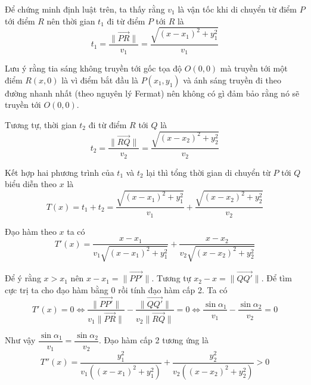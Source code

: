 Để chứng minh định luật trên, ta thấy rằng $v_1$ là vận tốc khi di chuyển từ điểm $P$ tới điểm $R$ nên thời gian $t_1$ đi từ điểm $P$ tới $R$ là
\begin{equation}
    t_1 = \frac{\lVert \overrightarrow{PR} \rVert}{v_1} = \frac{\sqrt{(x - x_1)^2 + y_1^2}}{v_1}
\end{equation}

Lưu ý rằng tia sáng không truyền tới gốc tọa độ $O(0,0)$ mà truyền tới một điểm $R(x,0)$ là vì điểm bắt đầu là $P(x_1, y_1)$ và ánh sáng truyền đi theo đường nhanh nhất (theo nguyên lý Fermat) nên không có gì đảm bảo rằng nó sẽ truyền tới $O(0, 0)$.

Tương tự, thời gian $t_2$ đi từ điểm $R$ tới $Q$ là
\begin{equation}
    t_2 = \frac{\lVert \overrightarrow{RQ} \rVert}{v_2} = \frac{\sqrt{(x - x_2)^2 + y_2^2}}{v_2}
\end{equation}

Kết hợp hai phương trình của $t_1$ và $t_2$ lại thì tổng thời gian di chuyển từ $P$ tới $Q$ biểu diễn theo $x$ là
\begin{equation}
    T(x) = t_1 + t_2 = \frac{\sqrt{(x - x_1)^2 + y_1^2}}{v_1} + \frac{\sqrt{(x - x_2)^2 + y_2^2}}{v_2}
\end{equation}

Đạo hàm theo $x$ ta có
\begin{equation}
    T'(x) = \frac{x - x_1}{v_1 \sqrt{(x - x_1)^2 + y_1^2}} + \frac{x - x_2}{v_2 \sqrt{(x - x_2)^2 + y_2^2}}
\end{equation}

Để ý rằng $x > x_1$ nên $x - x_1 = \lVert \overrightarrow{PP'} \rVert$. Tương tự $x_2 - x = \lVert \overrightarrow{QQ'} \rVert$. Để tìm cực trị ta cho đạo hàm bằng 0 rồi tính đạo hàm cấp 2. Ta có
\begin{equation*}
    T'(x) = 0 \Leftrightarrow \frac{\lVert \overrightarrow{PP'} \rVert}{v_1 \lVert \overrightarrow{PR} \rVert} - \frac{\lVert \overrightarrow{QQ'} \rVert}{v_2 \lVert \overrightarrow{RQ} \rVert} = 0 \Leftrightarrow \frac{\sin \alpha_1}{v_1} - \frac{\sin \alpha_2}{v_2} = 0
\end{equation*}

Như vậy $\dfrac{\sin \alpha_1}{v_1} = \dfrac{\sin \alpha_2}{v_2}$. Đạo hàm cấp 2 tương ứng là
\begin{equation*}
    T''(x) = \frac{y_1^2}{v_1 ((x - x_1)^2 + y_1^2)} + \frac{y_2^2}{v_2 ((x - x_2)^2 + y_2^2)} > 0
\end{equation*}

